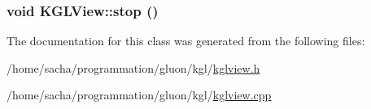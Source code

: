 \hypertarget{class_k_g_l_view_bfe4d0dd939222de9c9d4aa8c091b302}{
\subsubsection[{stop}]{\setlength{\rightskip}{0pt plus 5cm}void KGLView::stop ()}}
\label{class_k_g_l_view_bfe4d0dd939222de9c9d4aa8c091b302}




The documentation for this class was generated from the following files:\begin{CompactItemize}
\item 
/home/sacha/programmation/gluon/kgl/\hyperlink{kglview_8h}{kglview.h}\item 
/home/sacha/programmation/gluon/kgl/\hyperlink{kglview_8cpp}{kglview.cpp}\end{CompactItemize}
